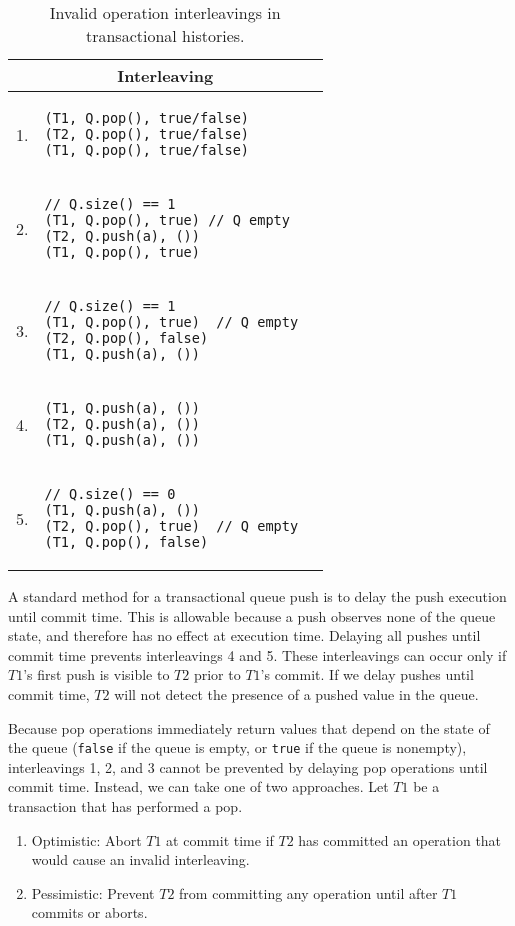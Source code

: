 \begin{table}
    \centering
    \begin{tabular}{|c|l|}
        \hline
\multicolumn{2}{|c|}{Interleaving}\\
        \hline
1. & 
\begin{lstlisting}
(T1, Q.pop(), true/false)  
(T2, Q.pop(), true/false)       
(T1, Q.pop(), true/false)
\end{lstlisting} 
       \\ 
    \hline
        2. & 
\begin{lstlisting}
// Q.size() == 1  
(T1, Q.pop(), true) // Q empty  
(T2, Q.push(a), ())
(T1, Q.pop(), true)
\end{lstlisting} 
       \\ 
    \hline
        3. & 
\begin{lstlisting}
// Q.size() == 1  
(T1, Q.pop(), true)  // Q empty  
(T2, Q.pop(), false)
(T1, Q.push(a), ())
\end{lstlisting} 
\\
\hline
        4. &
\begin{lstlisting}
(T1, Q.push(a), ()) 
(T2, Q.push(a), ())
(T1, Q.push(a), ())
\end{lstlisting} 
\\
\hline
        5. &
\begin{lstlisting}
// Q.size() == 0 
(T1, Q.push(a), ())       
(T2, Q.pop(), true)  // Q empty
(T1, Q.pop(), false) 
\end{lstlisting} 
\\
    \hline
\end{tabular}
    \caption{Invalid operation interleavings in transactional histories.}
    \label{tab:interleavings}
\end{table}

A standard method for a transactional queue push is to delay the push execution until commit time. This is allowable because a push observes none of the queue state, and therefore has no effect at execution time.
 Delaying all pushes until commit time prevents interleavings 4 and 5. These interleavings can occur only if $T1$'s first push is visible to $T2$ prior to $T1$'s commit. If we delay pushes until commit time, $T2$ will not detect the presence of a pushed value in the queue.

Because pop operations immediately return values that depend on the state of the queue (\texttt{false} if the queue is empty, or \texttt{true} if the queue is nonempty), interleavings 1, 2, and 3 cannot be prevented by delaying pop operations until commit time. Instead, we can take one of two approaches. Let $T1$ be a transaction that has performed a pop.
\begin{enumerate}
    \item Optimistic: Abort $T1$ at commit time if $T2$ has committed an operation that would cause an invalid interleaving.
    \item Pessimistic: Prevent $T2$ from committing any operation until after $T1$ commits or aborts.
\end{enumerate}

